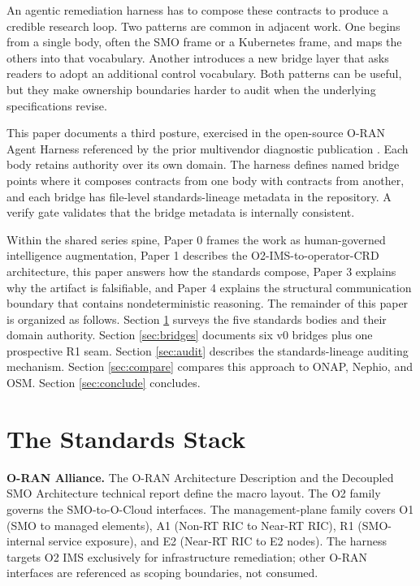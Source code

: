 \documentclass[twocolumn,10pt,a4paper]{article}
\begin{document}
An agentic remediation harness has to compose these contracts to produce a credible research loop. Two patterns are common in adjacent work. One begins from a single body, often the SMO frame or a Kubernetes frame, and maps the others into that vocabulary. Another introduces a new bridge layer that asks readers to adopt an additional control vocabulary. Both patterns can be useful, but they make ownership boundaries harder to audit when the underlying specifications revise.

This paper documents a third posture, exercised in the open-source O-RAN Agent Harness referenced by the prior multivendor diagnostic publication \cite{multivendor_blog_2026}. Each body retains authority over its own domain. The harness defines named bridge points where it composes contracts from one body with contracts from another, and each bridge has file-level standards-lineage metadata in the repository. A verify gate validates that the bridge metadata is internally consistent.

Within the shared series spine, Paper 0 frames the work as human-governed intelligence augmentation, Paper 1 describes the O2-IMS-to-operator-CRD architecture, this paper answers how the standards compose, Paper 3 explains why the artifact is falsifiable, and Paper 4 explains the structural communication boundary that contains nondeterministic reasoning. The remainder of this paper is organized as follows. Section \ref{sec:stack} surveys the five standards bodies and their domain authority. Section \ref{sec:bridges} documents six v0 bridges plus one prospective R1 seam. Section \ref{sec:audit} describes the standards-lineage auditing mechanism. Section \ref{sec:compare} compares this approach to ONAP, Nephio, and OSM. Section \ref{sec:conclude} concludes.

\section{The Standards Stack}
\label{sec:stack}

\textbf{O-RAN Alliance.} The O-RAN Architecture Description \cite{oran_wg1_arch} and the Decoupled SMO Architecture technical report \cite{oran_decoupled_smo} define the macro layout. The O2 family \cite{oran_o2_ganp,oran_o2_ims,oran_o2_dms} governs the SMO-to-O-Cloud interfaces. The management-plane family covers O1 \cite{oran_o1} (SMO to managed elements), A1 \cite{oran_a1} (Non-RT RIC to Near-RT RIC), R1 \cite{oran_r1} (SMO-internal service exposure), and E2 \cite{oran_e2} (Near-RT RIC to E2 nodes). The harness targets O2 IMS exclusively for infrastructure remediation; other O-RAN interfaces are referenced as scoping boundaries, not consumed.
\end{document}
